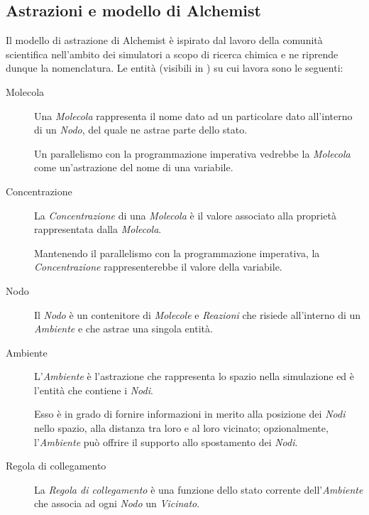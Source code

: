         \subsection{Astrazioni e modello di Alchemist}\label{subsec:modello}
            Il modello di astrazione di Alchemist è ispirato dal lavoro della comunità scientifica nell'ambito dei simulatori a scopo di ricerca chimica e ne riprende dunque la nomenclatura.
            Le entità (visibili in ) su cui lavora sono le seguenti:

            \begin{description}
                \item[Molecola]\label{itm:mol}
                    Una \emph{Molecola} rappresenta il nome dato ad un particolare dato all'interno di un \emph{Nodo}, del quale ne astrae parte dello stato.

                    Un parallelismo con la programmazione imperativa vedrebbe la \emph{Molecola} come un'astrazione del nome di una variabile.

                \item[Concentrazione]\label{itm:conc}
                    La \emph{Concentrazione} di una \emph{Molecola} è il valore associato alla proprietà rappresentata dalla \emph{Molecola}.

                    Mantenendo il parallelismo con la programmazione imperativa, la \emph{Concentrazione} rappresenterebbe il valore della variabile.

                \item[Nodo]\label{itm:node}
                    Il \emph{Nodo} è un contenitore di \emph{Molecole} e \emph{Reazioni} che risiede all'interno di un \emph{Ambiente} e che astrae una singola entità.

                \item[Ambiente]\label{itm:env}
                    L'\emph{Ambiente} è l'astrazione che rappresenta lo spazio nella simulazione ed è l'entità che contiene i \emph{Nodi}.

                    Esso è in grado di fornire informazioni in merito alla posizione dei \emph{Nodi} nello spazio, alla distanza tra loro e al loro vicinato;
                    opzionalmente, l'\emph{Ambiente} può offrire il supporto allo spostamento dei \emph{Nodi}.

                \item[Regola di collegamento]\label{itm:linkr}
                    La \emph{Regola di collegamento} è una funzione dello stato corrente dell'\emph{Ambiente} che associa ad ogni \emph{Nodo} un \emph{Vicinato}.


\end{description}
